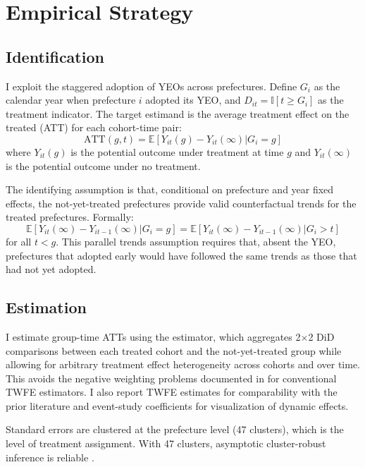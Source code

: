 \documentclass[12pt]{article}
\newcommand{\E}{\mathbb{E}}
\newcommand{\ind}{\mathbb{I}}
\begin{document}
\section{Empirical Strategy}

\subsection{Identification}

I exploit the staggered adoption of YEOs across prefectures. Define $G_i$ as the calendar year when prefecture $i$ adopted its YEO, and $D_{it} = \ind[t \geq G_i]$ as the treatment indicator. The target estimand is the average treatment effect on the treated (ATT) for each cohort-time pair:
\begin{equation}
  \text{ATT}(g, t) = \E[Y_{it}(g) - Y_{it}(\infty) | G_i = g]
\end{equation}
where $Y_{it}(g)$ is the potential outcome under treatment at time $g$ and $Y_{it}(\infty)$ is the potential outcome under no treatment.

The identifying assumption is that, conditional on prefecture and year fixed effects, the not-yet-treated prefectures provide valid counterfactual trends for the treated prefectures. Formally:
\begin{equation}
  \E[Y_{it}(\infty) - Y_{it-1}(\infty) | G_i = g] = \E[Y_{it}(\infty) - Y_{it-1}(\infty) | G_i > t]
\end{equation}
for all $t < g$. This parallel trends assumption requires that, absent the YEO, prefectures that adopted early would have followed the same trends as those that had not yet adopted.

\subsection{Estimation}

I estimate group-time ATTs using the \citet{callaway2021difference} estimator, which aggregates 2$\times$2 DiD comparisons between each treated cohort and the not-yet-treated group while allowing for arbitrary treatment effect heterogeneity across cohorts and over time. This avoids the negative weighting problems documented in \citet{goodmanbacon2021difference} for conventional TWFE estimators. I also report TWFE estimates for comparability with the prior literature and \citet{sun2021estimating} event-study coefficients for visualization of dynamic effects.

Standard errors are clustered at the prefecture level (47 clusters), which is the level of treatment assignment. With 47 clusters, asymptotic cluster-robust inference is reliable \citep{rambachan2023more}.
\end{document}
